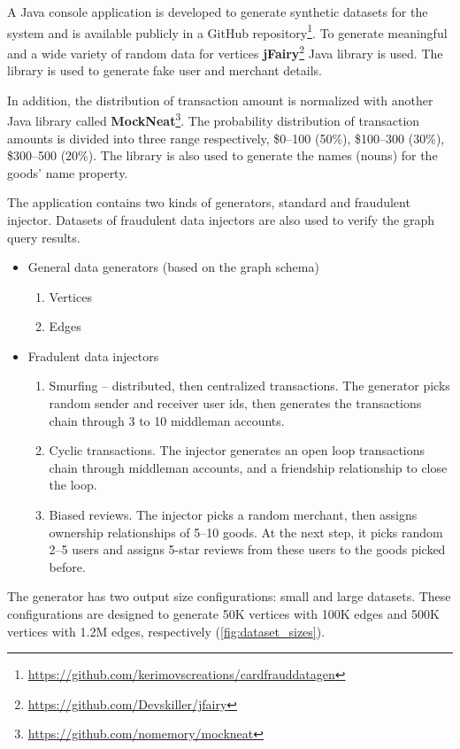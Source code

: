 A Java console application is developed to generate synthetic datasets for the system and is available publicly in a GitHub repository\footnote{\url{https://github.com/kerimovscreations/cardfrauddatagen}}.
To generate meaningful and a wide variety of random data for vertices \textbf{jFairy}\footnote{\url{https://github.com/Devskiller/jfairy}} Java library is used.
The library is used to generate fake user and merchant details.

In addition, the distribution of transaction amount is normalized with another Java library called \textbf{MockNeat}\footnote{\url{https://github.com/nomemory/mockneat}}.
The probability distribution of transaction amounts is divided into three range respectively, \$0--100 (50\%), \$100--300 (30\%), \$300--500 (20\%).
The library is also used to generate the names (nouns) for the goods' name property.

The application contains two kinds of generators, standard and fraudulent injector.
Datasets of fraudulent data injectors are also used to verify the graph query results.

\begin{itemize}
    \item General data generators (based on the graph schema)
    \begin{enumerate}
        \item Vertices
        \item Edges
    \end{enumerate}
    \item Fradulent data injectors
    \begin{enumerate}
        \item Smurfing -- distributed, then centralized transactions. 
        The generator picks random sender and receiver user ids, then generates the transactions chain through 3 to 10 middleman accounts.
        \item Cyclic transactions. The injector generates an open loop transactions chain through middleman accounts, and a friendship relationship to close the loop. 
        \item Biased reviews. The injector picks a random merchant, then assigns ownership relationships of 5--10 goods. At the next step, it picks random 2--5 users and assigns 5-star reviews from these users to the goods picked before.
    \end{enumerate}
\end{itemize}

The generator has two output size configurations: small and large datasets.
These configurations are designed to generate 50K vertices with 100K edges and 500K vertices with 1.2M edges, respectively (\autoref{fig:dataset_sizes}).

